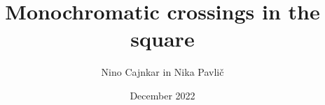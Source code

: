 \documentclass[a4paper,12pt]{article}
\begin{document}
\author{Nino Cajnkar in Nika Pavlič}
\date{December 2022}
\title{Monochromatic crossings in the square}
\maketitle
\end{document}
